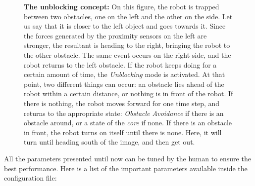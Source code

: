\documentclass[oneside, a4paper, 12pt]{memoir}
\let\oldCaption\caption
\renewcommand{\caption}[2]{
\oldCaption[#1]{{\small\sffamily\bfseries #1:} #2}
}
\begin{document}
			\begin{figure}[!htp]\centering
				
				\caption{The unblocking concept}{On this figure, the robot is trapped between two obstacles, one on the left and the other on the side. Let us say that it is closer to the left object and goes towards it. Since the forces generated by the proximity sensors on the left are stronger, the resultant is heading to the right, bringing the robot to the other obstacle. The same event occurs on the right side, and the robot returns to the left obstacle. If the robot keeps doing for a certain amount of time, the \emph{Unblocking} mode is activated. At that point, two different things can occur: an obstacle lies ahead of the robot within a certain distance, or nothing is in front of the robot. If there is nothing, the robot moves forward for one time step, and returns to the appropriate state: \emph{Obstacle Avoidance} if there is an obstacle around, or a state of the \emph{core} if none. If there is an obstacle in front, the robot turns on itself until there is none. Here, it will turn until heading south of the image, and then get out.}
				\label{fig:unblocking}
			\end{figure}
All the parameters presented until now can be tuned by the human to ensure the best performance. Here is a list of the important parameters available inside the configuration file:
		
\end{document}

